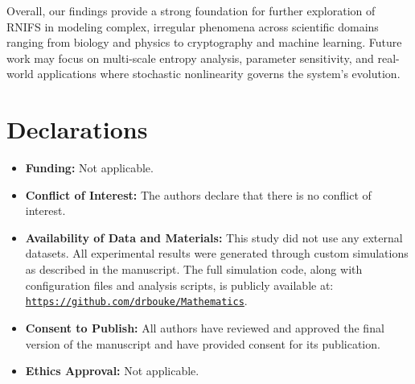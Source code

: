 \documentclass[twocolumn,10pt]{article}
\begin{document}
Overall, our findings provide a strong foundation for further exploration of RNIFS in modeling complex, irregular phenomena across scientific domains ranging from biology and physics to cryptography and machine learning. Future work may focus on multi-scale entropy analysis, parameter sensitivity, and real-world applications where stochastic nonlinearity governs the system's evolution.


\section*{Declarations}
\vspace{0.8em}
\begin{itemize}
  \item \textbf{Funding:} Not applicable.
  
  \item \textbf{Conflict of Interest:} The authors declare that there is no conflict of interest.

\item \textbf{Availability of Data and Materials: } 
This study did not use any external datasets. All experimental results were generated through custom simulations as described in the manuscript. The full simulation code, along with configuration files and analysis scripts, is publicly available at:  
\href{https://github.com/drbouke/Mathematics/tree/main}{\texttt{https://github.com/drbouke/Mathematics}}.

  \item \textbf{Consent to Publish:} All authors have reviewed and approved the final version of the manuscript and have provided consent for its publication.

  \item \textbf{Ethics Approval:} Not applicable.
\end{itemize}
\end{document}
